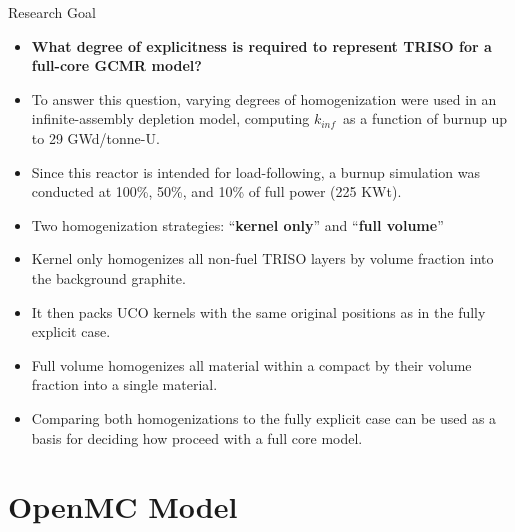 \documentclass[9pt,t,aspectratio=169]{beamer}
\newcommand{\kinf}{$k_{inf}$}
\begin{document}
\begin{frame}{Research Goal}
    \pause
    \begin{itemize}
        \item<2-> \textbf{What degree of explicitness is required to represent TRISO for a full-core GCMR model?}
        \item<3-> To answer this question, varying degrees of homogenization were used in an infinite-assembly depletion model, computing \kinf~as a function of burnup up to 29 GWd/tonne-U.
        \item<4-> Since this reactor is intended for load-following, a burnup simulation was conducted at 100\%, 50\%, and 10\% of full power (225 KWt).
        \item<5-> Two homogenization strategies: ``\textbf{kernel only}'' and ``\textbf{full volume}''
        \item<6-> Kernel only homogenizes all non-fuel TRISO layers by volume fraction into the background graphite.
        \item<7-> It then packs UCO kernels with the same original positions as in the fully explicit case.
        \item<8-> Full volume homogenizes all material within a compact by their volume fraction into a single material.
        \item<9-> Comparing both homogenizations to the fully explicit case can be used as a basis for deciding how proceed with a full core model.
    \end{itemize}
\end{frame}

\section{OpenMC Model}
\end{document}
